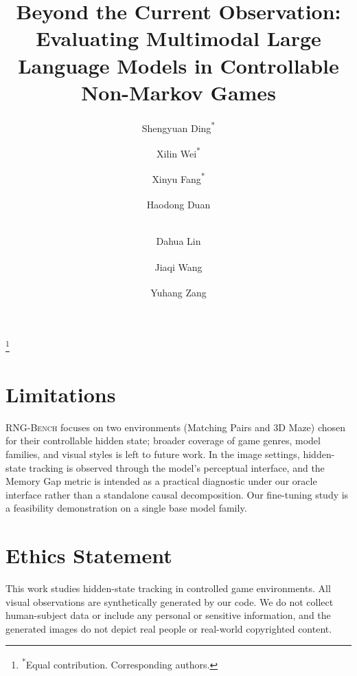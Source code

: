 \documentclass[]{template}
\title{Beyond the Current Observation: Evaluating Multimodal Large Language Models in Controllable Non-Markov Games}
\author[1,2,3]{Shengyuan Ding\textsuperscript{*}}
\author[1]{Xilin Wei\textsuperscript{*}}
\author[4]{Xinyu Fang\textsuperscript{*}}
\author[5]{Haodong Duan\textsuperscript{\textdagger}}
\author[3,5]{\protect\\ Dahua Lin}
\author[2]{Jiaqi Wang\textsuperscript{\textdagger}}
\author[3]{Yuhang Zang\textsuperscript{\textdagger}}
\affil[1]{Fudan University}
\affil[2]{Shanghai Innovation Institute}
\affil[3]{Shanghai Artificial Intelligence Laboratory}
\affil[4]{Zhejiang University}
\affil[5]{The Chinese University of Hong Kong}
\newcommand{\benchname}{\textsc{RNG-Bench}\xspace}
\newcommand\blfootnote[1]{%
  \begingroup
  \renewcommand\thefootnote{}\footnote{#1}%
  \addtocounter{footnote}{-1}%
  \endgroup
}
\begin{document}
\maketitle
\blfootnote{\textsuperscript{*}Equal contribution. \textsuperscript{\textdagger}Corresponding authors.}








\section*{Limitations}
\benchname{} focuses on two environments (Matching Pairs and 3D Maze) chosen for their controllable hidden state; broader coverage of game genres, model families, and visual styles is left to future work. In the image settings, hidden-state tracking is observed through the model's perceptual interface, and the Memory Gap metric is intended as a practical diagnostic under our oracle interface rather than a standalone causal decomposition. Our fine-tuning study is a feasibility demonstration on a single base model family.

\section*{Ethics Statement}
This work studies hidden-state tracking in controlled game environments. All visual observations are synthetically generated by our code. We do not collect human-subject data or include any personal or sensitive information, and the generated images do not depict real people or real-world copyrighted content.





\clearpage
\appendix


\end{document}
